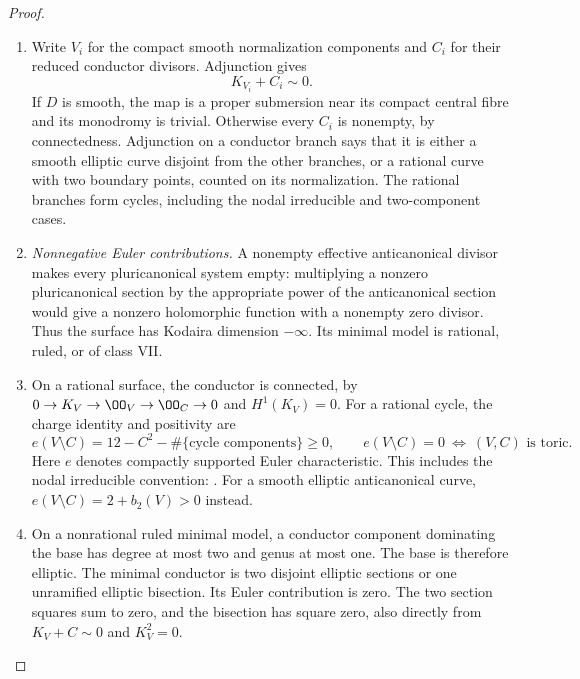 \begin{proof}
\begin{enumerate}[label=\arabic*.,leftmargin=*]
\item Write $V_i$ for the compact smooth normalization
components and $C_i$ for their reduced conductor divisors.
Adjunction gives
\begin{equation}
 K_{V_i}+C_i\sim0.
\label{pub:I:eq:B-4-28-2}
\end{equation}
If $D$ is smooth, the map is a proper submersion near
its compact central fibre and its monodromy is trivial.
Otherwise every $C_i$ is nonempty, by connectedness.
Adjunction on a conductor branch says that it is either
a smooth elliptic curve disjoint from the other branches,
or a rational curve with two boundary points, counted
on its normalization. The rational branches form cycles,
including the nodal irreducible and two-component cases.

\item \emph{Nonnegative Euler contributions.}
A nonempty effective anticanonical divisor makes every
pluricanonical system empty: multiplying a nonzero
pluricanonical section by the appropriate power of the
anticanonical section would give a nonzero holomorphic
function with a nonempty zero divisor. Thus the surface
has Kodaira dimension $-\infty$. Its minimal model is
rational, ruled, or of class VII.

\item On a rational surface, the conductor is connected, by
$0\to K_V\to\OO_V\to\OO_C\to0$ and $H^1(K_V)=0$.
For a rational cycle, the charge identity and positivity
are
\begin{equation}
 e(V\setminus C)=12-C^2-\#\{\text{cycle components}\}
 \ge0,\qquad
 e(V\setminus C)=0\ \Longleftrightarrow\ (V,C)
 \text{ is toric}.
\label{pub:I:eq:B-4-28-3}
\end{equation}
Here $e$ denotes compactly supported Euler characteristic.
This includes the nodal irreducible convention:
\citet[arXiv version~2, Section~1, p.~3; Definition~1.1 and Lemma~1.2, pp.~4--5; Lemma~2.2, p.~11; Lemma~2.7, p.~14]{Friedman2016AB}.
For a smooth elliptic anticanonical curve,
$e(V\setminus C)=2+b_2(V)>0$ instead.

\item On a nonrational ruled minimal model, a conductor
component dominating the base has degree at most two
and genus at most one. The base is therefore elliptic.
The minimal conductor is two disjoint elliptic sections
or one unramified elliptic bisection. Its Euler
contribution is zero. The two section squares sum to
zero, and the bisection has square zero, also directly
from $K_V+C\sim0$ and $K_V^2=0$.


\end{enumerate}
\end{proof}
